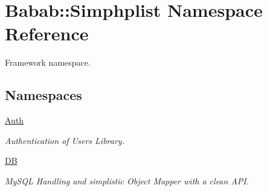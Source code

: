 \hypertarget{namespaceBabab_1_1Simphplist}{\section{Babab\+:\+:Simphplist Namespace Reference}
\label{namespaceBabab_1_1Simphplist}
}


Framework namespace.  


\subsection*{Namespaces}
\begin{DoxyCompactItemize}
\item 
 \hyperlink{namespaceBabab_1_1Simphplist_1_1Auth}{Auth}
\begin{DoxyCompactList}\small\item\em Authentication of Users Library. \end{DoxyCompactList}\item 
 \hyperlink{namespaceBabab_1_1Simphplist_1_1DB}{D\+B}
\begin{DoxyCompactList}\small\item\em My\+S\+Q\+L Handling and simplistic Object Mapper with a clean A\+P\+I. \end{DoxyCompactList}\end{DoxyCompactItemize}
